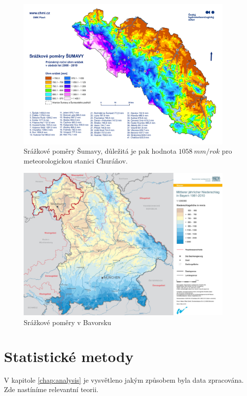\begin{figure}
	\centering
	\includegraphics[width=0.95\textwidth]{img/ch1/srazkovepomerysumava.png}
	\caption{Srážkové poměry Šumavy\cite{srazkovepomerysumava}, důležitá je pak hodnota $\SI{1058}{mm/rok}$ pro meteorologickou stanici Churáňov.}
	\label{fig:srazkovepomerysumava}
\end{figure}

\begin{figure}
	\centering
	\includegraphics[width=0.95\textwidth]{img/ch1/srazkovepomerybavorskyles.png}
	\caption{Srážkové poměry v Bavorsku\cite{srazkovepomerybavorskyles}}
	\label{fig:srazkovepomerybavorskyles}
\end{figure}

\clearpage

\section{Statistické metody}\label{chap:statistika}
V kapitole \ref{chap:analysis} je vysvětleno jakým způsobem byla data zpracována. Zde nastíníme relevantní teorii.

